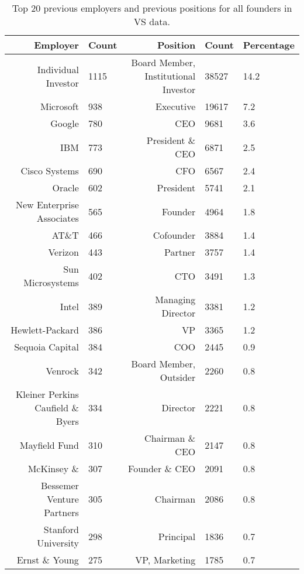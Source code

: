 \begin{table}[!htb]
\centering
\begingroup\footnotesize
\begin{tabular}{rlrll}
  \toprule
Employer & Count & Position & Count & Percentage \\ 
  \midrule
Individual Investor & 1115 & Board Member, Institutional Investor & 38527 & 14.2 \\ 
  Microsoft & 938 & Executive & 19617 & 7.2 \\ 
  Google & 780 & CEO & 9681 & 3.6 \\ 
  IBM & 773 & President \& CEO & 6871 & 2.5 \\ 
  Cisco Systems & 690 & CFO & 6567 & 2.4 \\ 
  Oracle & 602 & President & 5741 & 2.1 \\ 
  New Enterprise Associates & 565 & Founder & 4964 & 1.8 \\ 
  AT\&T & 466 & Cofounder & 3884 & 1.4 \\ 
  Verizon & 443 & Partner & 3757 & 1.4 \\ 
  Sun Microsystems & 402 & CTO & 3491 & 1.3 \\ 
  Intel & 389 & Managing Director & 3381 & 1.2 \\ 
  Hewlett-Packard & 386 & VP & 3365 & 1.2 \\ 
  Sequoia Capital & 384 & COO & 2445 & 0.9 \\ 
  Venrock & 342 & Board Member, Outsider & 2260 & 0.8 \\ 
  Kleiner Perkins Caufield \& Byers & 334 & Director & 2221 & 0.8 \\ 
  Mayfield Fund & 310 & Chairman \& CEO & 2147 & 0.8 \\ 
  McKinsey \& & 307 & Founder \& CEO & 2091 & 0.8 \\ 
  Bessemer Venture Partners & 305 & Chairman & 2086 & 0.8 \\ 
  Stanford University & 298 & Principal & 1836 & 0.7 \\ 
  Ernst \& Young & 275 & VP, Marketing & 1785 & 0.7 \\ 
   \bottomrule
\end{tabular}
\endgroup
\caption{Top 20 previous employers and previous positions for all founders in VS data.} 
\label{table:VS_previousEmployersSummaryTable}
\end{table}
